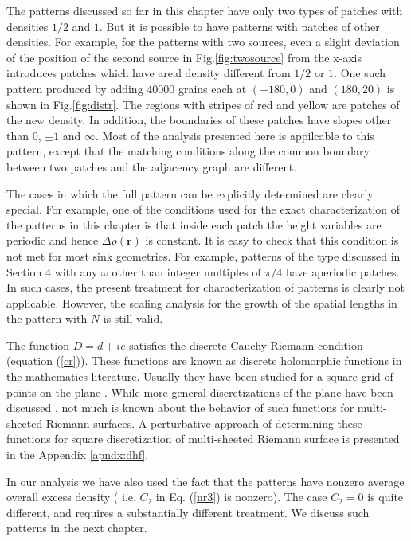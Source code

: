 \documentclass[11pt,a4paper]{book}
\begin{document}
The patterns discussed so far in this chapter have only two types of patches with densities
$1/2$ and $1$. But it is possible to have patterns with patches of other densities. For example,
for the patterns with two sources, even a slight deviation
of the position of the second source in Fig.\ref{fig:twosource} from the x-axis
introduces patches which have areal density different from $1/2$ or $1$. One
such pattern produced by adding $40000$ grains each at $\left( -180, 0 \right)$
and $\left( 180, 20 \right)$ is shown in Fig.\ref{fig:distr}. The regions with
stripes of red and yellow are patches of the new density. In addition, the boundaries of
these patches have slopes other than $0$, $\pm 1$ and $\infty$. Most of
the analysis presented here is appilcable to this pattern, except that the matching
conditions along the common boundary between two patches and the adjacency graph are different.


The cases in which the full pattern can be explicitly determined are clearly special. 
For example, one of the conditions used for the exact characterization of the patterns in this chapter is that
inside each patch the height variables are periodic and hence $\Delta\rho\left( \mathbf{r} \right)$
is constant. It is easy to check that this condition is not met for most sink geometries.
For example, patterns  of the type discussed in Section $4$
with any $\omega$ other than integer multiples of $\pi/4$ have aperiodic
patches. In such cases, the present treatment for characterization of patterns is
clearly not applicable. However, the scaling analysis for the growth of
the spatial lengths in the pattern with $N$ is still valid.

The function $D=d+ie$ satisfies the discrete Cauchy-Riemann condition (equation (\ref{cr})). These functions are known as discrete  holomorphic
functions in the mathematics literature. Usually they have been studied  for a square grid of 
points on the plane \cite{duffin,spitzer}. While more general discretizations of the plane have
been discussed  \cite{mercat,laszlo}, not much is known about the behavior of such functions 
for multi-sheeted Riemann surfaces. A perturbative approach of
determining these functions for square discretization of multi-sheeted
Riemann surface is presented in the Appendix \ref{apndx:dhf}.

In our analysis we have also used the fact that the patterns have nonzero average overall 
excess density ( i.e. $C_2$ in Eq. (\ref{nr3}) is nonzero). 
The case $C_2=0$ is quite different, and requires a substantially different treatment.
We discuss such patterns in the next chapter.
\end{document}

